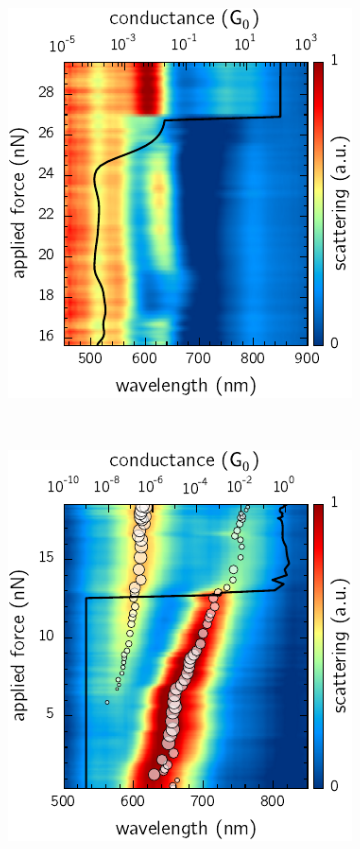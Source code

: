 \documentclass[a4paper]{article}
\begin{document}
\begin{figure}[h]
\centering
\begin{subfigure}[t]{0.4\textwidth}
	\flushright
	\includegraphics{figures/orig_spherical_tip_dimer_tunnelling_focus}
	\label{fig:scan1}
\end{subfigure}
~
\begin{subfigure}[t]{0.4\textwidth}
	\flushleft
	\includegraphics{figures/echem_tip_dimer_tunnelling_focus}
	\label{fig:scan2}
\end{subfigure}

\end{figure}
\end{document}
